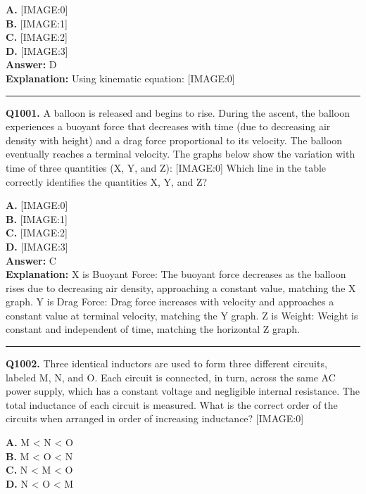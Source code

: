 \documentclass[12pt]{article}
\begin{document}
\textbf{A.} [IMAGE:0] \\
\textbf{B.} [IMAGE:1] \\
\textbf{C.} [IMAGE:2] \\
\textbf{D.} [IMAGE:3] \\

\textbf{Answer:} D \\
\textbf{Explanation:} Using kinematic equation:
[IMAGE:0]

\hrule
\vspace{1em}


\noindent
\textbf{Q1001.} A balloon is released and begins to rise. During the ascent, the balloon experiences a buoyant force that decreases with time (due to decreasing air density with height) and a drag force proportional to its velocity. The balloon eventually reaches a terminal velocity. The graphs below show the variation with time of three quantities (X, Y, and Z):
[IMAGE:0]
Which line in the table correctly identifies the quantities X, Y, and Z?



\textbf{A.} [IMAGE:0] \\
\textbf{B.} [IMAGE:1] \\
\textbf{C.} [IMAGE:2] \\
\textbf{D.} [IMAGE:3] \\

\textbf{Answer:} C \\
\textbf{Explanation:} \cdot 
X is Buoyant Force: The buoyant force decreases as the balloon rises due to decreasing air density, approaching a constant value, matching the X graph.
\cdot 
Y is Drag Force: Drag force increases with velocity and approaches a constant value at terminal velocity, matching the Y graph.
\cdot 
Z is Weight: Weight is constant and independent of time, matching the horizontal Z graph.

\hrule
\vspace{1em}


\noindent
\textbf{Q1002.} Three identical inductors are used to form three different circuits, labeled M, N, and O. Each circuit is connected, in turn, across the same AC power supply, which has a constant voltage and negligible internal resistance. The total inductance of each circuit is measured. What is the correct order of the circuits when arranged in order of increasing inductance?
[IMAGE:0]



\textbf{A.} M < N < O \\
\textbf{B.} M < O < N \\
\textbf{C.} N < M < O \\
\textbf{D.} N < O < M \\
\end{document}
